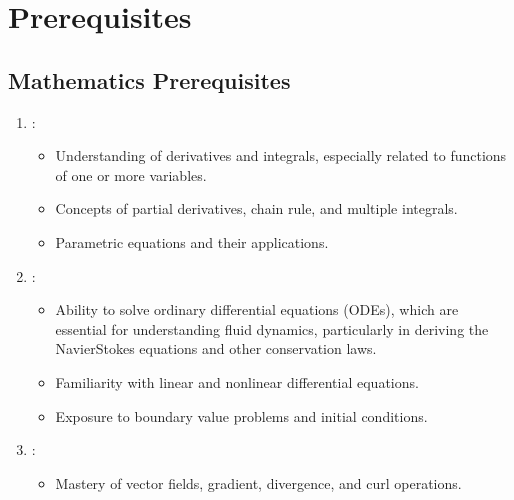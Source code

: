 \documentclass[letterpaper,10pt,english]{jupyterBook}
\begin{document}
\sphinxstepscope


\chapter{Prerequisites}
\label{\detokenize{prerequisites:prerequisites}}\label{\detokenize{prerequisites::doc}}

\section{Mathematics Prerequisites}
\label{\detokenize{prerequisites:mathematics-prerequisites}}\begin{enumerate}
%
\item {} 
\sphinxAtStartPar
{}:
\begin{itemize}
\item {} 
\sphinxAtStartPar
Understanding of derivatives and integrals, especially related to functions of one or more variables.

\item {} 
\sphinxAtStartPar
Concepts of partial derivatives, chain rule, and multiple integrals.

\item {} 
\sphinxAtStartPar
Parametric equations and their applications.

\end{itemize}

\item {} 
\sphinxAtStartPar
{}:
\begin{itemize}
\item {} 
\sphinxAtStartPar
Ability to solve ordinary differential equations (ODEs), which are essential for understanding fluid dynamics, particularly in deriving the Navier\sphinxhyphen{}Stokes equations and other conservation laws.

\item {} 
\sphinxAtStartPar
Familiarity with linear and non\sphinxhyphen{}linear differential equations.

\item {} 
\sphinxAtStartPar
Exposure to boundary value problems and initial conditions.

\end{itemize}

\item {} 
\sphinxAtStartPar
{}:
\begin{itemize}
\item {} 
\sphinxAtStartPar
Mastery of vector fields, gradient, divergence, and curl operations.


\end{itemize}
\end{enumerate}
\end{document}
